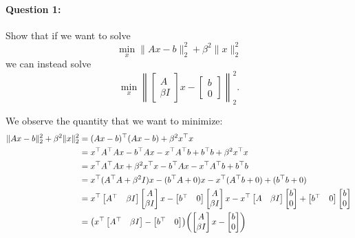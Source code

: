 \documentclass[11pt,onecolumn]{article}
\DeclarePairedDelimiter{\norm}{\lVert}{\rVert}
\DeclarePairedDelimiter{\PAREN}{(}{)}
\newcommand{\bluebox}[1]{
  \begin{tcolorbox}[colback=blue!5!white,colframe=blue!75!black,boxrule=0.5pt,boxsep=0pt,left=6pt,right=16pt,top=4pt,bottom=4pt]
  #1
  \end{tcolorbox}   
}
\begin{document}
\newpage
\bluebox{
\paragraph{Question 1:}
Show that if we want to solve $$\min_x \|Ax-b\|_2^2 + \beta^2 \|x\|_2^2$$ we can instead solve 
\[
\min_x \left\|\begin{bmatrix}A \\ \beta I\end{bmatrix}x-\begin{bmatrix}b \\ 0\end{bmatrix}\right\|_2^2.
\]}

We observe the quantity that we want to minimize:
\begin{align*}
  \norm{Ax-b}_2^2+\beta^2\norm{x}_2^2 &= (Ax-b)^\top(Ax-b)+\beta^2x^\top x
  \\ &=x^\top A^\top Ax-b^\top Ax-x^\top A^\top b+b^\top b+\beta^2x^\top x
  \\ &=x^\top A^\top Ax+\beta^2 x^\top x - b^\top Ax - x^\top A^\top b+b^\top b
  \\ &= x^\top (A^\top A + \beta^2 I) x - (b^\top A + 0)x-x^\top (A^\top b + 0) + (b^\top b + 0)
  \\ &= x^\top \begin{bmatrix} A^\top & \beta I\end{bmatrix}\begin{bmatrix}A \\ \beta I\end{bmatrix} x - \begin{bmatrix}b^\top & 0\end{bmatrix}\begin{bmatrix}A \\ \beta I\end{bmatrix}x-x^\top \begin{bmatrix}A & \beta I\end{bmatrix} \begin{bmatrix}b \\ 0\end{bmatrix} + \begin{bmatrix}b^\top & 0\end{bmatrix}\begin{bmatrix}b \\ 0\end{bmatrix} 
  \\ &=\PAREN*{x^\top \begin{bmatrix} A^\top & \beta I\end{bmatrix} - \begin{bmatrix}b^\top & 0 \end{bmatrix}} \PAREN*{\begin{bmatrix} A \\ \beta I\end{bmatrix}x - \begin{bmatrix}b \\ 0 \end{bmatrix}}

\end{align*}
\end{document}
